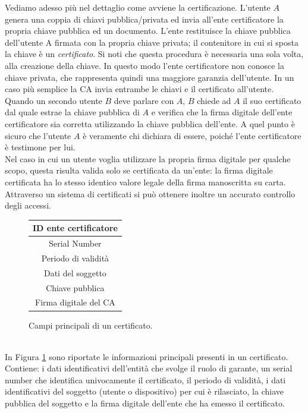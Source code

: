 Vediamo adesso più nel dettaglio come avviene la certificazione. L'utente $A$ genera una coppia di chiavi pubblica/privata ed invia all'ente certificatore la propria chiave pubblica ed un documento. L'ente restituisce la chiave pubblica dell'utente A firmata con la propria chiave privata; il contenitore in cui si sposta la chiave è un \textit{certificato}. Si noti che questa procedura è necessaria una sola volta, alla creazione della chiave. In questo modo l'ente certificatore non conosce la chiave privata, che rappresenta quindi una maggiore garanzia dell'utente. In un caso più semplice la CA invia entrambe le chiavi e il certificato all'utente.\\
Quando un secondo utente $B$ deve parlare con $A$, $B$ chiede ad $A$ il suo certificato dal quale estrae la chiave pubblica di $A$ e verifica che la firma digitale dell'ente certificatore sia corretta utilizzando la chiave pubblica dell'ente. A quel punto è sicuro che l'utente $A$ è veramente chi dichiara di essere, poiché l'ente certificatore è testimone per lui.\\
Nel caso in cui un utente voglia utilizzare la propria firma digitale per qualche scopo, questa risulta valida solo se certificata da un'ente: la firma digitale certificata ha lo stesso identico valore legale della firma manoscritta su carta. Attraverso un sistema di certificati si può ottenere inoltre un accurato controllo degli accessi.
\begin{figure}[htbp]
	\centering
	\begin{tabular}{|c|}
		\hline
		ID ente certificatore \\
		\hline
		Serial Number \\
		\hline
		Periodo di validità \\
		\hline
		Dati del soggetto \\
		\hline
		Chiave pubblica \\
		\hline
		Firma digitale del CA \\ \hline
	\end{tabular}
	\caption{Campi principali di un certificato.}
	\label{tab:certificate}
\end{figure}\\
In Figura \ref{tab:certificate} sono riportate le informazioni principali presenti in un certificato. Contiene: i dati identificativi dell'entità che svolge il ruolo di garante, un serial number che identifica univocamente il certificato, il periodo di validità, i dati identificativi del soggetto (utente o dispositivo) per cui è rilasciato, la chiave pubblica del soggetto e la firma digitale dell'ente che ha emesso il certificato.

